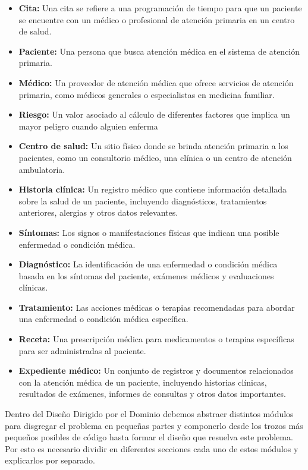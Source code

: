 \begin{itemize}
\item \textbf{Cita:} Una cita se refiere a una programación de tiempo para que un paciente se encuentre con un médico o profesional de atención primaria en un centro de salud.
\item \textbf{Paciente:} Una persona que busca atención médica en el sistema de atención primaria.
\item \textbf{Médico:} Un proveedor de atención médica que ofrece servicios de atención primaria, como médicos generales o especialistas en medicina familiar.
\item \textbf{Riesgo:} Un valor asociado al cálculo de diferentes factores que implica un mayor peligro cuando alguien enferma
\item \textbf{Centro de salud:} Un sitio físico donde se brinda atención primaria a los pacientes, como un consultorio médico, una clínica o un centro de atención ambulatoria.
\item \textbf{Historia clínica:} Un registro médico que contiene información detallada sobre la salud de un paciente, incluyendo diagnósticos, tratamientos anteriores, alergias y otros datos relevantes.
\item \textbf{Síntomas:} Los signos o manifestaciones físicas que indican una posible enfermedad o condición médica.
\item \textbf{Diagnóstico:} La identificación de una enfermedad o condición médica basada en los síntomas del paciente, exámenes médicos y evaluaciones clínicas.
\item \textbf{Tratamiento:} Las acciones médicas o terapias recomendadas para abordar una enfermedad o condición médica específica.
\item \textbf{Receta:} Una prescripción médica para medicamentos o terapias específicas para ser administradas al paciente.
\item \textbf{Expediente médico:} Un conjunto de registros y documentos relacionados con la atención médica de un paciente, incluyendo historias clínicas, resultados de exámenes, informes de consultas y otros datos importantes.
\end{itemize}

Dentro del Diseño Dirigido por el Dominio debemos abstraer distintos módulos para disgregar el problema en pequeñas partes
y componerlo desde los trozos más pequeños posibles de código hasta formar el diseño que resuelva este problema.
Por esto es necesario dividir en diferentes secciones cada uno de estos módulos y explicarlos por separado.

